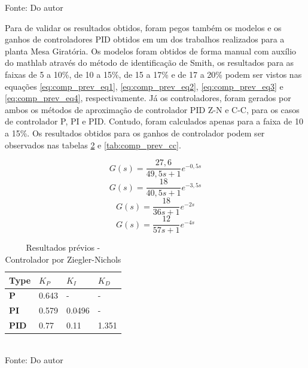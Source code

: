 \begin{table}[H]
\begin{tabular}{|c|c|c|c|c|c|c|}
        \hline
    \end{tabular}
    \label{tab:results_tanque}
    \vspace{0cm}\hspace{0cm}\small{Fonte: Do autor}
\end{table}

Para de validar os resultados obtidos, foram pegos também os modelos e os ganhos de controladores PID obtidos em um dos
trabalhos realizados para a planta Mesa Giratória.
Os modelos foram obtidos de forma manual com auxílio do mathlab através do método de identificação de Smith, os
resultados para as faixas de 5 a 10\%, de 10 a 15\%, de 15 a 17\% e de 17 a 20\% podem ser vistos nas equações
\eqref{eq:comp_prev_eq1}, \eqref{eq:comp_prev_eq2}, \eqref{eq:comp_prev_eq3} e \eqref{eq:comp_prev_eq4}, respectivamente.
Já os controladores, foram gerados por ambos os métodos de aproximação de controlador PID Z-N e C-C, para os
casos de controlador P, PI e PID. Contudo, foram calculados apenas para a faixa de 10 a 15\%.
Os resultados obtidos para os ganhos de controlador podem ser observados nas tabelas
\ref{tab:comp_prev_zn} e \ref{tab:comp_prev_cc}.

\begin{equation}
    \label{eq:comp_prev_eq1}
    G(s) = \frac{27,6}{49,5 s + 1}e^{-0,5 s}
\end{equation}
\begin{equation}
    \label{eq:comp_prev_eq2}
    G(s) = \frac{18}{40,5 s + 1}e^{-3,5 s}
\end{equation}
\begin{equation}
    \label{eq:comp_prev_eq3}
    G(s) = \frac{18}{36 s + 1}e^{-2 s}
\end{equation}
\begin{equation}
    \label{eq:comp_prev_eq4}
    G(s) = \frac{12}{57 s + 1}e^{-4 s}
\end{equation}

\begin{table}[H]
    \caption{Resultados prévios - Controlador por Ziegler-Nichols}
    \centering
    \begin{tabular}{|l|l|l|l|}
        \hline
        \textbf{Type} & \textbf{$K_P$} & \textbf{$K_I$} & \textbf{$K_D$} \\
        \hline
        \textbf{P}    & 0.643          & -              & -              \\
        \hline
        \textbf{PI}   & 0.579          & 0.0496         & -              \\
        \hline
        \textbf{PID}  & 0.77           & 0.11           & 1.351          \\
        \hline
    \end{tabular}
    \label{tab:comp_prev_zn}
    \\
    \vspace{0cm}\hspace{0cm}\small{Fonte: Do autor}
\end{table}

